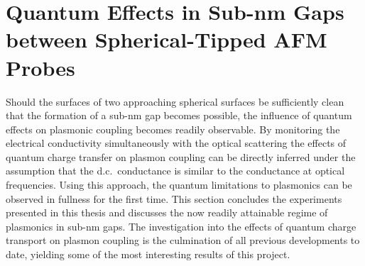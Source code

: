 \documentclass[a4paper]{article}
\begin{document}
\section{Quantum Effects in Sub-nm Gaps between Spherical-Tipped AFM Probes}

Should the surfaces of two approaching spherical surfaces be sufficiently clean that the formation of a sub-nm gap becomes possible, the influence of quantum effects on plasmonic coupling becomes readily observable. By monitoring the electrical conductivity simultaneously with the optical scattering the effects of quantum charge transfer on plasmon coupling can be directly inferred under the assumption that the d.c.\ conductance is similar to the conductance at optical frequencies. %
Using this approach, the quantum limitations to plasmonics can be observed in fullness for the first time.
This section concludes the experiments presented in this thesis and discusses the now readily attainable regime of plasmonics in sub-nm gaps. The investigation into the effects of quantum charge transport on plasmon coupling is the culmination of all previous developments to date, yielding some of the most interesting results of this project.

\end{document}
